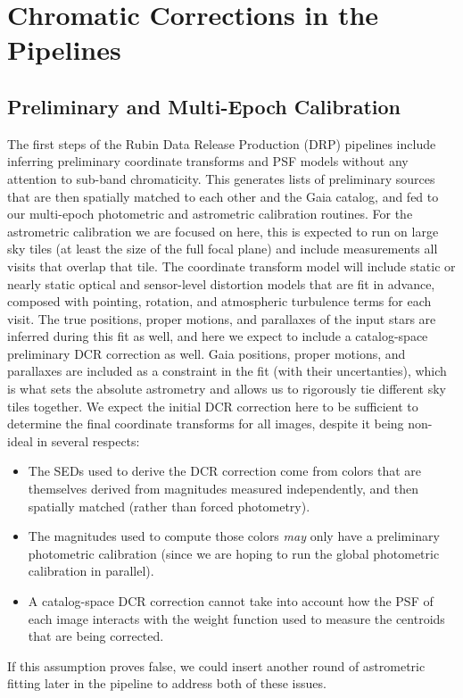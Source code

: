 \documentclass[DM,authoryear,toc]{lsstdoc}
\begin{document}
\section{Chromatic Corrections in the Pipelines}

\subsection{Preliminary and Multi-Epoch Calibration}

The first steps of the Rubin Data Release Production (DRP) pipelines include inferring preliminary coordinate transforms and PSF models without any attention to sub-band chromaticity.
This generates lists of preliminary sources that are then spatially matched to each other and the Gaia catalog, and fed to our multi-epoch photometric and astrometric calibration routines.
For the astrometric calibration we are focused on here, this is expected to run on large sky tiles (at least the size of the full focal plane) and include measurements all visits that overlap that tile.
The coordinate transform model will include static or nearly static optical and sensor-level distortion models that are fit in advance, composed with pointing, rotation, and atmospheric turbulence terms for each visit.
The true positions, proper motions, and parallaxes of the input stars are inferred during this fit as well, and here we expect to include a catalog-space preliminary DCR correction as well.
Gaia positions, proper motions, and parallaxes are included as a constraint in the fit (with their uncertanties), which is what sets the absolute astrometry and allows us to rigorously tie different sky tiles together.
We expect the initial DCR correction here to be sufficient to determine the final coordinate transforms for all images, despite it being non-ideal in several respects:
\begin{itemize}
  \item The SEDs used to derive the DCR correction come from colors that are themselves derived from magnitudes measured independently, and then spatially matched (rather than forced photometry).
  \item The magnitudes used to compute those colors \emph{may} only have a preliminary photometric calibration (since we are hoping to run the global photometric calibration in parallel).
  \item A catalog-space DCR correction cannot take into account how the PSF of each image interacts with the weight function used to measure the centroids that are being corrected.
\end{itemize}
If this assumption proves false, we could insert another round of astrometric fitting later in the pipeline to address both of these issues.
\end{document}
